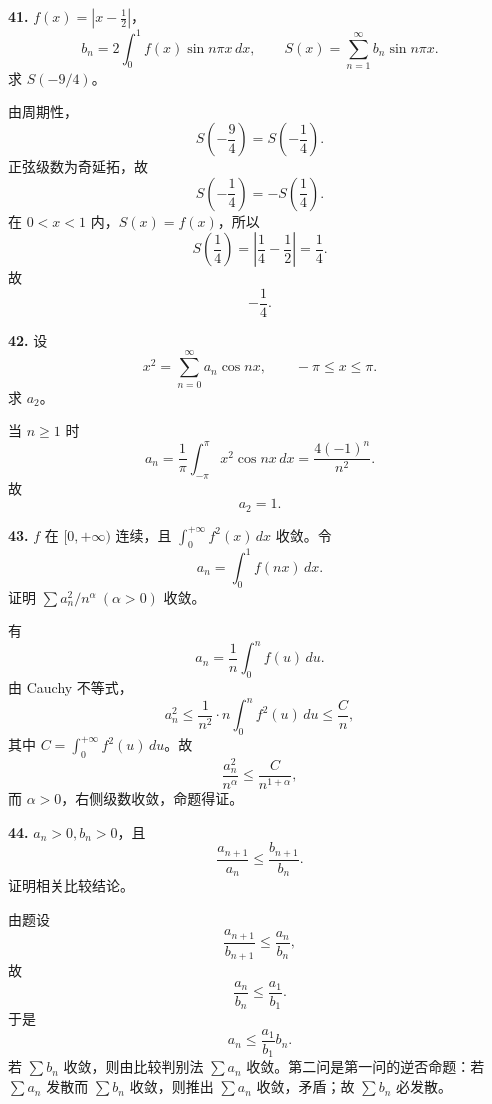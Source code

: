 \begin{problemblock}
\textbf{41.} \(f(x)=|x-\frac12|\)，
\[
b_n=2\int_0^1f(x)\sin n\pi x\,dx,\qquad
S(x)=\sum_{n=1}^{\infty}b_n\sin n\pi x.
\]
求 \(S(-9/4)\)。
\end{problemblock}
\begin{solutionblock}
由周期性，
\[
S\left(-\frac94\right)=S\left(-\frac14\right).
\]
正弦级数为奇延拓，故
\[
S\left(-\frac14\right)=-S\left(\frac14\right).
\]
在 \(0<x<1\) 内，\(S(x)=f(x)\)，所以
\[
S\left(\frac14\right)=\left|\frac14-\frac12\right|=\frac14.
\]
故
\[
\boxed{-\frac14}.
\]
\end{solutionblock}

\begin{problemblock}
\textbf{42.} 设
\[
x^2=\sum_{n=0}^{\infty}a_n\cos nx,\qquad -\pi\le x\le\pi.
\]
求 \(a_2\)。
\end{problemblock}
\begin{solutionblock}
当 \(n\ge1\) 时
\[
a_n=\frac1\pi\int_{-\pi}^{\pi}x^2\cos nx\,dx
=\frac{4(-1)^n}{n^2}.
\]
故
\[
\boxed{a_2=1}.
\]
\end{solutionblock}

\begin{problemblock}
\textbf{43.} \(f\) 在 \([0,+\infty)\) 连续，且 \(\int_0^{+\infty}f^2(x)\,dx\) 收敛。令
\[
a_n=\int_0^1f(nx)\,dx.
\]
证明 \(\sum a_n^2/n^\alpha\ (\alpha>0)\) 收敛。
\end{problemblock}
\begin{solutionblock}
有
\[
a_n=\frac1n\int_0^n f(u)\,du.
\]
由 Cauchy 不等式，
\[
a_n^2\le\frac1{n^2}\cdot n\int_0^n f^2(u)\,du
\le\frac{C}{n},
\]
其中 \(C=\int_0^{+\infty}f^2(u)\,du\)。故
\[
\frac{a_n^2}{n^\alpha}\le \frac{C}{n^{1+\alpha}},
\]
而 \(\alpha>0\)，右侧级数收敛，命题得证。
\end{solutionblock}

\begin{problemblock}
\textbf{44.} \(a_n>0,b_n>0\)，且
\[
\frac{a_{n+1}}{a_n}\le\frac{b_{n+1}}{b_n}.
\]
证明相关比较结论。
\end{problemblock}
\begin{solutionblock}
由题设
\[
\frac{a_{n+1}}{b_{n+1}}\le\frac{a_n}{b_n},
\]
故
\[
\frac{a_n}{b_n}\le\frac{a_1}{b_1}.
\]
于是
\[
a_n\le\frac{a_1}{b_1}b_n.
\]
若 \(\sum b_n\) 收敛，则由比较判别法 \(\sum a_n\) 收敛。第二问是第一问的逆否命题：若 \(\sum a_n\) 发散而 \(\sum b_n\) 收敛，则推出 \(\sum a_n\) 收敛，矛盾；故 \(\sum b_n\) 必发散。
\end{solutionblock}

